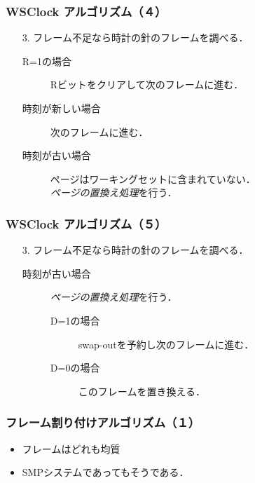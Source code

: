 \documentclass[handout]{beamer}                   %
\begin{document}
\begin{frame}
  \frametitle{WSClock アルゴリズム（４）}


  \begin{enumerate}
  \item[3.] フレーム不足なら時計の針のフレームを調べる．
    \begin{description}
    \item[R=1の場合]
      Rビットをクリアして次のフレームに進む．
    \item[時刻が新しい場合]
      次のフレームに進む．
    \item[時刻が古い場合]
      ページはワーキングセットに含まれていない．\\
      \emph{ページの置換え処理}を行う．
    \end{description}
  \end{enumerate}
\end{frame}

\begin{frame}
  \frametitle{WSClock アルゴリズム（５）}


  \begin{enumerate}
  \item[3.] フレーム不足なら時計の針のフレームを調べる．
    \begin{description}
    \item[時刻が古い場合] \emph{ページの置換え処理}を行う．
      \begin{description}
      \item[D=1の場合]
        swap-outを予約し次のフレームに進む．
      \item[D=0の場合]
        このフレームを置き換える．
      \end{description}
    \end{description}
  \end{enumerate}
\end{frame}

\begin{frame}
  \frametitle{フレーム割り付けアルゴリズム（１）}
  \begin{itemize}
  \item フレームはどれも均質
  \item SMPシステムであってもそうである．
  \end{itemize}
\end{frame}
\end{document}
